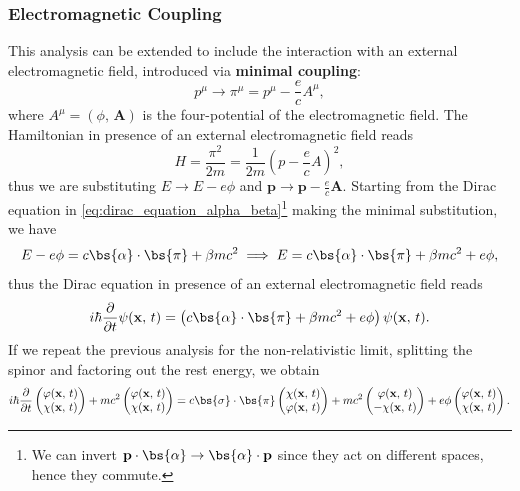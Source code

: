 \subsubsection{Electromagnetic Coupling}

This analysis can be extended to include the interaction with an external electromagnetic field, introduced via \textbf{minimal coupling}:
\[
    p^{\mu} \to \pi^{\mu} = p^{\mu} - \frac{e}{c} A^{\mu},
\]
where \(A^{\mu} = (\phi,\, \mathbf{A})\) is the four-potential of the electromagnetic field. The Hamiltonian in presence of an external electromagnetic field reads
\[
    H = \frac{\pi^2}{2m} = \frac{1}{2m}\left(p - \frac{e}{c}A\right)^2,
\]
thus we are substituting \(E \to E - e\phi\) and \(\mathbf{p} \to \mathbf{p} - \frac{e}{c} \mathbf{A}\).
Starting from the Dirac equation in \eqref{eq:dirac_equation_alpha_beta}\footnote{We can invert \(\mathbf{p} \cdot \bs{\alpha} \to \bs{\alpha}\cdot \mathbf{p}\) since they act on different spaces, hence they commute.} making the minimal substitution, we have
\[
    E - e\phi = c \bs{\alpha} \cdot \bs{\pi} + \beta m c^2 \implies E = c \bs{\alpha} \cdot \bs{\pi} + \beta m c^2 + e \phi,
\]
thus the Dirac equation in presence of an external electromagnetic field reads
\[
    i \hbar \frac{\partial}{\partial t} \psi(\mathbf{x},\,t) = \left(c \bs{\alpha} \cdot \bs{\pi} + \beta m c^2 + e \phi \right) \psi(\mathbf{x},\,t).
\]
If we repeat the previous analysis for the non-relativistic limit, splitting the spinor and factoring out the rest energy, we obtain
\[
    i \hbar \frac{\partial}{\partial t} \begin{pmatrix}
        \varphi(\mathbf{x},\,t) \\
        \chi(\mathbf{x},\,t)
    \end{pmatrix} + mc^2 \begin{pmatrix}
        \varphi(\mathbf{x},\,t) \\
        \chi(\mathbf{x},\,t)
    \end{pmatrix} = c \bs{\sigma} \cdot \bs{\pi} \begin{pmatrix}
        \chi(\mathbf{x},\,t) \\
        \varphi(\mathbf{x},\,t)
    \end{pmatrix} + mc^2 \begin{pmatrix}
        \varphi(\mathbf{x},\,t) \\
        -\chi(\mathbf{x},\,t)
    \end{pmatrix} + e \phi \begin{pmatrix}
        \varphi(\mathbf{x},\,t) \\
        \chi(\mathbf{x},\,t)
    \end{pmatrix}.
\]
